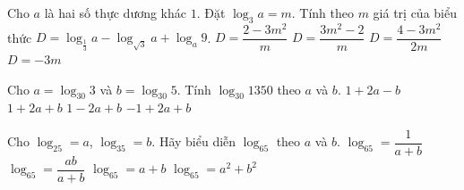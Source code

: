 \begin{ex}%
	Cho $a$ là hai số thực dương khác $1$. Đặt  $\log_3a=m$. Tính theo $m$ giá trị của biểu thức $D=\log_{\tfrac{1}{3}} a-\log_{\sqrt{3}} a+\log_a 9$.
	\choice 
		{\True $D=\dfrac{2-3m^2}{m}$} 
		 {$D=\dfrac{3m^2-2}{m}$}
		 {$D=\dfrac{4-3m^2}{2m}$}
		 {$D=-3m$}
\end{ex}

\begin{ex}%
	Cho $a=\log_{30}  3$ và $b=\log_{30} 5$. Tính $\log_{30} 1350$ theo $a$ và $b$.
	 \choice
		 {$1+2a-b$}
		 {\True $1+2a+b$}
		{$1-2a+b$} 
		 {$-1+2a+b$}
\end{ex}

\begin{ex}%
	Cho $\log_25=a$, $\log_35=b$.  Hãy biểu diễn $\log_65$ theo $a$ và $b$.
	 \choice
		{$\log_65=\dfrac{1}{a+b}$} 
		{\True $\log_65=\dfrac{a  b}{a+b}$}
		{$\log_65=a+b$} 
		{$\log_65=a^2+b^2$} 
\end{ex}




